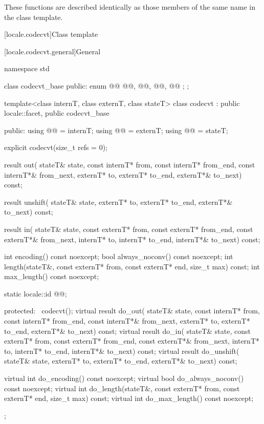 \pnum
These functions are described identically as those members of the same name
in the  class template.

[locale.codecvt]{Class template }

[locale.codecvt.general]{General}

%
%
\begin{codeblock}
namespace std {
  class codecvt_base {
  public:
    enum @@ { @@, @@, @@, @@ };
  };

  template<class internT, class externT, class stateT>
  class codecvt : public locale::facet, public codecvt_base {
  public:
    using @@ = internT;
    using @@ = externT;
    using @@  = stateT;

    explicit codecvt(size_t refs = 0);

    result out(
      stateT& state,
      const internT* from, const internT* from_end, const internT*& from_next,
            externT*   to,       externT*   to_end,       externT*&   to_next) const;

    result unshift(
      stateT& state,
            externT*    to,      externT*   to_end,       externT*&   to_next) const;

    result in(
      stateT& state,
      const externT* from, const externT* from_end, const externT*& from_next,
            internT*   to,       internT*   to_end,       internT*&   to_next) const;

    int encoding() const noexcept;
    bool always_noconv() const noexcept;
    int length(stateT&, const externT* from, const externT* end, size_t max) const;
    int max_length() const noexcept;

    static locale::id @@;

  protected:
    ~codecvt();
    virtual result do_out(
      stateT& state,
      const internT* from, const internT* from_end, const internT*& from_next,
            externT* to,         externT*   to_end,       externT*&   to_next) const;
    virtual result do_in(
      stateT& state,
      const externT* from, const externT* from_end, const externT*& from_next,
            internT* to,         internT*   to_end,       internT*&   to_next) const;
    virtual result do_unshift(
      stateT& state,
            externT* to,         externT*   to_end,       externT*&   to_next) const;

    virtual int do_encoding() const noexcept;
    virtual bool do_always_noconv() const noexcept;
    virtual int do_length(stateT&, const externT* from, const externT* end, size_t max) const;
    virtual int do_max_length() const noexcept;
  };
}
\end{codeblock}

